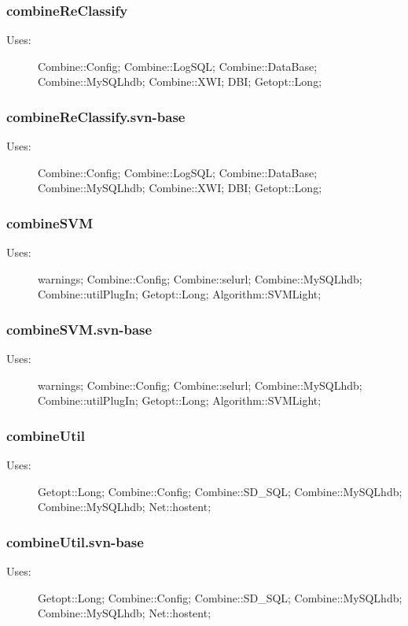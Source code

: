 \subsubsection{combineReClassify}
\begin{description}
\item[Uses:] Combine::Config; Combine::LogSQL; Combine::DataBase; Combine::MySQLhdb; Combine::XWI; DBI; Getopt::Long; 

\end{description}
\subsubsection{combineReClassify.svn-base}
\begin{description}
\item[Uses:] Combine::Config; Combine::LogSQL; Combine::DataBase; Combine::MySQLhdb; Combine::XWI; DBI; Getopt::Long; 

\end{description}
\subsubsection{combineSVM}
\begin{description}
\item[Uses:] warnings; Combine::Config; Combine::selurl; Combine::MySQLhdb; Combine::utilPlugIn; Getopt::Long; Algorithm::SVMLight; 

\end{description}
\subsubsection{combineSVM.svn-base}
\begin{description}
\item[Uses:] warnings; Combine::Config; Combine::selurl; Combine::MySQLhdb; Combine::utilPlugIn; Getopt::Long; Algorithm::SVMLight; 

\end{description}
\subsubsection{combineUtil}
\begin{description}
\item[Uses:] Getopt::Long; Combine::Config; Combine::SD\_SQL; Combine::MySQLhdb; Combine::MySQLhdb; Net::hostent; 

\end{description}
\subsubsection{combineUtil.svn-base}
\begin{description}
\item[Uses:] Getopt::Long; Combine::Config; Combine::SD\_SQL; Combine::MySQLhdb; Combine::MySQLhdb; Net::hostent; 

\end{description}
